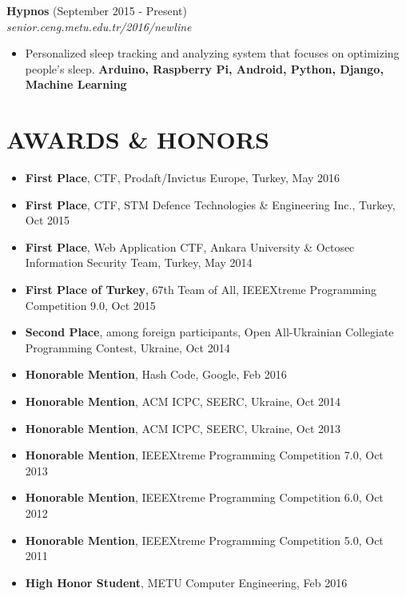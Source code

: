 \documentclass[margin, 10pt]{res} %
\begin{document}
\begin{resume}
\newpage

{\bf Hypnos} \hfill (September 2015 - Present) \\
\textit{senior.ceng.metu.edu.tr/2016/newline}
\begin{itemize} 
\item Personalized sleep tracking and analyzing system that focuses on optimizing people's sleep. {\bf Arduino, Raspberry Pi, Android, Python, Django, Machine Learning }
\end{itemize} 















\section{AWARDS \& HONORS}
\begin{itemize} \itemsep -2pt %
\item {\bf First Place}, CTF, Prodaft/Invictus Europe, Turkey, May 2016
\item {\bf First Place}, CTF, STM Defence Technologies \& Engineering Inc., Turkey, Oct 2015
\item {\bf First Place}, Web Application CTF, Ankara University \& Octosec Information Security Team, Turkey, May 2014
\item {\bf First Place of Turkey}, 67th Team of All, IEEEXtreme Programming Competition 9.0, Oct 2015
\item {\bf Second Place}, among foreign participants, Open All-Ukrainian Collegiate Programming Contest, Ukraine, Oct 2014
\item {\bf Honorable Mention}, Hash Code, Google, Feb 2016
\item {\bf Honorable Mention}, ACM ICPC, SEERC, Ukraine, Oct 2014
\item {\bf Honorable Mention}, ACM ICPC, SEERC, Ukraine, Oct 2013
\item {\bf Honorable Mention}, IEEEXtreme Programming Competition 7.0, Oct 2013
\item {\bf Honorable Mention}, IEEEXtreme Programming Competition 6.0, Oct 2012
\item {\bf Honorable Mention}, IEEEXtreme Programming Competition 5.0, Oct 2011
\item {\bf High Honor Student}, METU Computer Engineering, Feb 2016


\end{itemize}
\end{resume}
\end{document}

